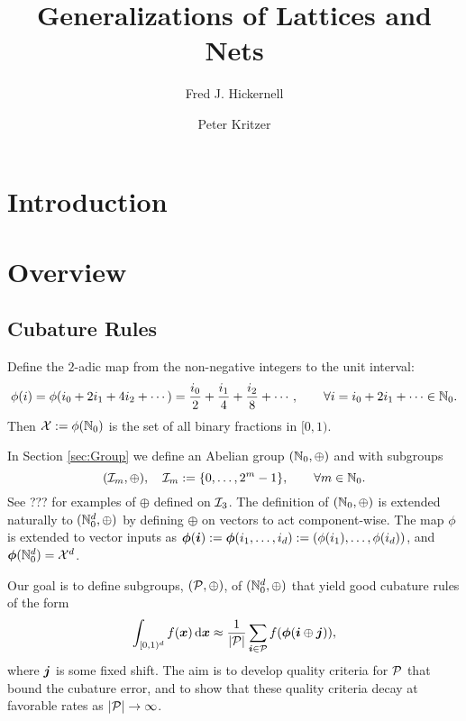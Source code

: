 \documentclass[12pt]{amsart}
\title{Generalizations of Lattices and Nets}
\author{Fred J. Hickernell}
\author{Peter Kritzer}
\begin{document}
\maketitle

\section{Introduction}

\section{Overview}

\subsection{Cubature Rules}
Define the $2$-adic map from the non-negative integers to the unit interval:
\begin{equation} \label{phiDef}
\phi(i) = \phi(i_0 + 2 i_1 + 4 i_2 + \cdots) = \frac{i_0}{2} + \frac{i_1}{4} + \frac{i_2} {8} + \cdots, \qquad \forall i = i_0 + 2 i_1 + \cdots \in \mathbb{N}_{0}.
\end{equation}
Then $\mathcal{X}:= \phi(\mathbb{N}_{0})$ is the set of all binary fractions in $[0,1)$.


In Section \ref{sec:Group} we define an Abelian group $(\mathbb{N}_{0},\oplus)$ and with subgroups
\begin{equation} \label{ImDef}
    (\mathcal{I}_m,\oplus), \quad \mathcal{I}_m := \{0, \ldots, 2^m -1\}, \qquad \forall m \in \mathbb{N}_{0}.
\end{equation}
See ??? for examples of $\oplus$ defined on $\mathcal{I}_3$.  The definition of  $(\mathbb{N}_{0},\oplus)$ is  extended naturally to  $(\mathbb{N}_{0}^d, \oplus)$ by defining $\oplus$ on vectors to act component-wise.  The map $\phi$ is  extended to vector inputs as $\boldsymbol{\phi}(\boldsymbol{i}) := \boldsymbol{\phi}(i_1, \ldots, i_d) := (\phi(i_1), \ldots, \phi(i_d))$, and $\boldsymbol{\phi}(\mathbb{N}_{0}^d) = \mathcal{X}^d$. 

Our goal is to define subgroups, $(\mathcal{P},\oplus)$, of $(\mathbb{N}_{0}^d, \oplus)$ that yield good cubature rules of the form
\begin{equation*}
    \int_{[0,1)^d} f(\boldsymbol{x}) \, {\rm d} \boldsymbol{x} \approx \frac 1{\left \lvert \mathcal{P} \right \rvert} \sum_{\boldsymbol{i} \in \mathcal{P}} f(\boldsymbol{\phi}(\boldsymbol{i} \oplus \boldsymbol{j})),
\end{equation*}
where $\boldsymbol{j}$ is some fixed shift.  The aim is to develop quality criteria for $\mathcal{P}$ that bound the cubature error, and to show that these quality criteria decay at favorable rates as $\left \lvert \mathcal{P} \right \rvert \to \infty$.
\end{document}
